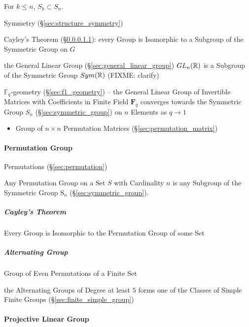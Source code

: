For $k \leq n$, $S_k \subset S_n$.

Symmetry (\S\ref{sec:structure_symmetry})

Cayley's Theorem (\S\ref{sec:cayleys_theorem}): every Group is
Isomorphic to a Subgroup of the Symmetric Group on $G$

\fist the General Linear Group (\S\ref{sec:general_linear_group})
$GL_n(\mathbb{R})$ is a Subgroup of the Symmetric Group $Sym(\mathbb{R})$ (FIXME:
clarify)

\fist $\mathbb{F}_q$-geometry (\S\ref{sec:f1_geometry}) -- the General Linear
Group of Invertible Matrices with Coefficients in Finite Field $\mathbf{F}_q$
converges towards the Symmetric Group $S_n$ (\S\ref{sec:symmetric_group}) on $n$
Elements as $q \rightarrow 1$

\begin{itemize}
  \item Group of $n \times n$ Permutation Matrices
    (\S\ref{sec:permutation_matrix})
\end{itemize}



\paragraph{Permutation Group}\label{sec:permutation_group}\hfill

Permutations (\S\ref{sec:permutation})

Any Permutation Group on a Set $S$ with Cardinality $n$ is any
Subgroup of the Symmetric Group $\mathrm{S}_n$
(\S\ref{sec:symmetric_group}).



\subparagraph{Cayley's Theorem}\label{sec:cayleys_theorem}\hfill

Every Group is Isomorphic to the Permutation Group of some Set



\subparagraph{Alternating Group}\label{sec:alternating_group}\hfill

Group of Even Permutations of a Finite Set

the Alternating Groups of Degree at least $5$ forms one of the Classes of Simple
Finite Groups (\S\ref{sec:finite_simple_group})



\paragraph{Projective Linear Group}\label{sec:projective_linear_group}\hfill

